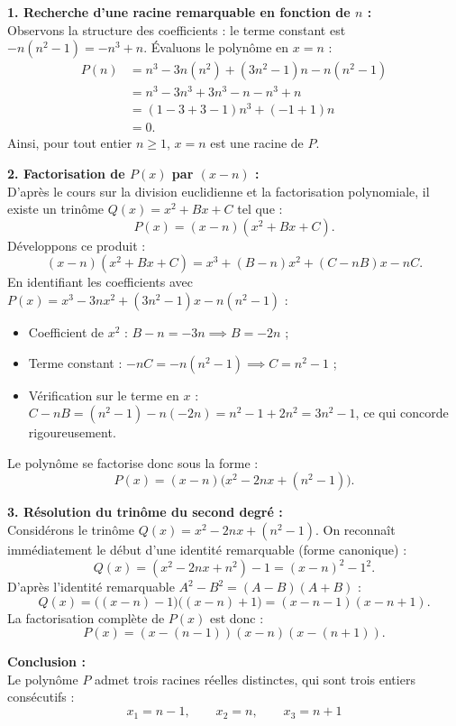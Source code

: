 \documentclass[11pt,a4paper]{article}
\begin{document}
\begin{correctionbox}
\textbf{1. Recherche d'une racine remarquable en fonction de $n$ :}\\
Observons la structure des coefficients : le terme constant est $-n(n^2 - 1) = -n^3 + n$.
Évaluons le polynôme en $x = n$ :
\[
\begin{aligned}
P(n) &= n^3 - 3n(n^2) + (3n^2 - 1)n - n(n^2 - 1) \\
&= n^3 - 3n^3 + 3n^3 - n - n^3 + n \\
&= (1 - 3 + 3 - 1)n^3 + (-1 + 1)n \\
&= 0.
\end{aligned}
\]
Ainsi, pour tout entier $n \ge 1$, $x = n$ est une racine de $P$.

\textbf{2. Factorisation de $P(x)$ par $(x - n)$ :}\\
D'après le cours sur la division euclidienne et la factorisation polynomiale, il existe un trinôme $Q(x) = x^2 + Bx + C$ tel que :
\[
P(x) = (x - n)(x^2 + Bx + C).
\]
Développons ce produit :
\[
(x - n)(x^2 + Bx + C) = x^3 + (B - n)x^2 + (C - nB)x - nC.
\]
En identifiant les coefficients avec $P(x) = x^3 - 3nx^2 + (3n^2 - 1)x - n(n^2 - 1)$ :
\begin{itemize}[leftmargin=*,label=\textbullet]
    \item Coefficient de $x^2$ : $B - n = -3n \implies B = -2n$ ;
    \item Terme constant : $-nC = -n(n^2 - 1) \implies C = n^2 - 1$ ;
    \item Vérification sur le terme en $x$ : $C - nB = (n^2 - 1) - n(-2n) = n^2 - 1 + 2n^2 = 3n^2 - 1$, ce qui concorde rigoureusement.
\end{itemize}
Le polynôme se factorise donc sous la forme :
\[
P(x) = (x - n)\bigl(x^2 - 2nx + (n^2 - 1)\bigr).
\]

\textbf{3. Résolution du trinôme du second degré :}\\
Considérons le trinôme $Q(x) = x^2 - 2nx + (n^2 - 1)$.
On reconnaît immédiatement le début d'une identité remarquable (forme canonique) :
\[
Q(x) = (x^2 - 2nx + n^2) - 1 = (x - n)^2 - 1^2.
\]
D'après l'identité remarquable $A^2 - B^2 = (A - B)(A + B)$ :
\[
Q(x) = \bigl((x - n) - 1\bigr)\bigl((x - n) + 1\bigr) = (x - n - 1)(x - n + 1).
\]
La factorisation complète de $P(x)$ est donc :
\[
P(x) = (x - (n - 1))(x - n)(x - (n + 1)).
\]

\textbf{Conclusion :}\\
Le polynôme $P$ admet trois racines réelles distinctes, qui sont trois entiers consécutifs :
\[
\boxed{x_1 = n - 1, \qquad x_2 = n, \qquad x_3 = n + 1}
\]
\end{correctionbox}
\end{document}
